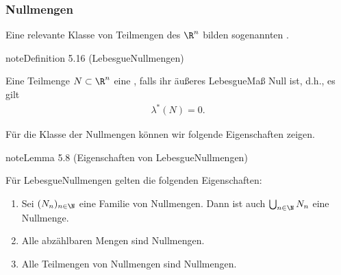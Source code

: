 \documentclass[letterpaper,10pt,german]{jupyterBook}
\begin{document}
\subsubsection{Nullmengen}
\label{\detokenize{masstheorie/masstheorie:nullmengen}}
\sphinxAtStartPar
Eine relevante Klasse von Teilmengen des \(\R^n\) bilden sogenannten .
\label{masstheorie/masstheorie:definition-36}
\begin{sphinxadmonition}{note}{Definition 5.16 (Lebesgue\sphinxhyphen{}Nullmengen)}



\sphinxAtStartPar
Eine Teilmenge \(N \subset \R^n\) eine , falls ihr äußeres Lebesgue\sphinxhyphen{}Maß Null ist, d.h., es gilt
\begin{equation*}
\begin{split}\lambda^*(N) = 0.\end{split}
\end{equation*}\end{sphinxadmonition}

\sphinxAtStartPar
Für die Klasse der Nullmengen können wir folgende Eigenschaften zeigen.
\label{masstheorie/masstheorie:lem:eigenschaftenNullmengen}
\begin{sphinxadmonition}{note}{Lemma 5.8 (Eigenschaften von Lebesgue\sphinxhyphen{}Nullmengen)}



\sphinxAtStartPar
Für Lebesgue\sphinxhyphen{}Nullmengen gelten die folgenden Eigenschaften:
\begin{enumerate}
%
\item {} 
\sphinxAtStartPar
Sei \((N_n)_{n\in\N}\) eine Familie von Nullmengen.
Dann ist auch \(\bigcup_{n\in\N} N_n\) eine Nullmenge.

\item {} 
\sphinxAtStartPar
Alle abzählbaren Mengen sind Nullmengen.

\item {} 
\sphinxAtStartPar
Alle Teilmengen von Nullmengen sind Nullmengen.

\end{enumerate}
\end{sphinxadmonition}
\end{document}
